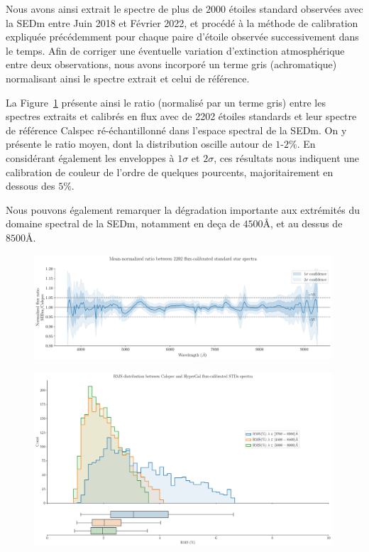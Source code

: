 \documentclass[../main/main.tex]{subfiles}
\begin{document}
Nous avons ainsi extrait le spectre de plus de $2000$ étoiles standard
observées avec la SEDm entre Juin 2018 et Février 2022, et procédé
à la méthode de calibration expliquée précédemment pour chaque paire d'étoile observée
successivement dans le temps.
Afin de corriger une éventuelle variation d'extinction atmosphérique
entre deux observations, nous avons incorporé un terme gris
(achromatique) normalisant ainsi le spectre extrait et celui de référence.

La Figure~\ref{fig:allratio_std} présente ainsi le ratio (normalisé par
un terme gris) entre les spectres extraits et calibrés en flux avec \hypergal de 2202 étoiles
standards et leur spectre de référence Calspec ré-échantillonné dans
l'espace spectral de la SEDm. On y présente le ratio moyen, dont la
distribution oscille autour de $1$-$2\%$. En considérant également les
enveloppes à $1\sigma$ et $2\sigma$, ces résultats nous indiquent une
calibration de couleur de l'ordre de quelques pourcents, majoritairement
en dessous des $5\%$.

Nous pouvons également remarquer la dégradation importante aux
extrémités du domaine spectral de la SEDm, notamment en deça de
$4500$\AA, et au dessus de $8500$\AA.

\begin{figure}[ht]
  \centering
  \includegraphics[width=0.99\textwidth]{../figures/06_irf/fluxcalstd_all_ratio.pdf}
  \caption[]{}
  \label{fig:allratio_std}
\end{figure}

\begin{figure}[ht]
  \centering
  \includegraphics[width=0.99\textwidth]{../figures/06_irf/rmsallstd_fluxcalibration.pdf}
  \caption[]{}
  \label{fig:}
\end{figure}



\end{document}
